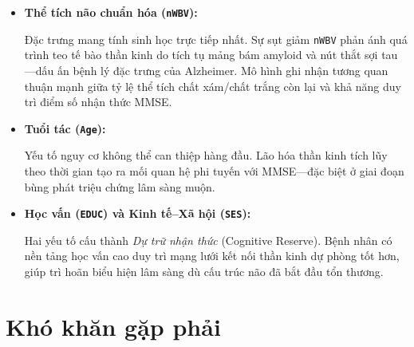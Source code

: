 \begin{itemize}
  \item \textbf{Thể tích não chuẩn hóa (\texttt{nWBV}):} 
  
  Đặc trưng mang tính
        sinh học trực tiếp nhất. Sự sụt giảm \texttt{nWBV} phản ánh quá trình
        teo tế bào thần kinh do tích tụ mảng bám amyloid và nút thắt sợi
        tau—dấu ấn bệnh lý đặc trưng của Alzheimer. Mô hình ghi nhận tương quan
        thuận mạnh giữa tỷ lệ thể tích chất xám/chất trắng còn lại và khả năng
        duy trì điểm số nhận thức MMSE.
 
  \item \textbf{Tuổi tác (\texttt{Age}):} 
  
    Yếu tố nguy cơ không thể can thiệp
        hàng đầu. Lão hóa thần kinh tích lũy theo thời gian tạo ra mối quan hệ
        phi tuyến với MMSE—đặc biệt ở giai đoạn bùng phát triệu chứng lâm sàng
        muộn.
 
  \item \textbf{Học vấn (\texttt{EDUC}) và Kinh tế--Xã hội (\texttt{SES}):}

        Hai yếu tố cấu thành \emph{Dự trữ nhận thức} (Cognitive Reserve). Bệnh
        nhân có nền tảng học vấn cao duy trì mạng lưới kết nối thần kinh dự
        phòng tốt hơn, giúp trì hoãn biểu hiện lâm sàng dù cấu trúc não đã bắt
        đầu tổn thương.
\end{itemize}

\newpage

\section{Khó khăn gặp phải}

